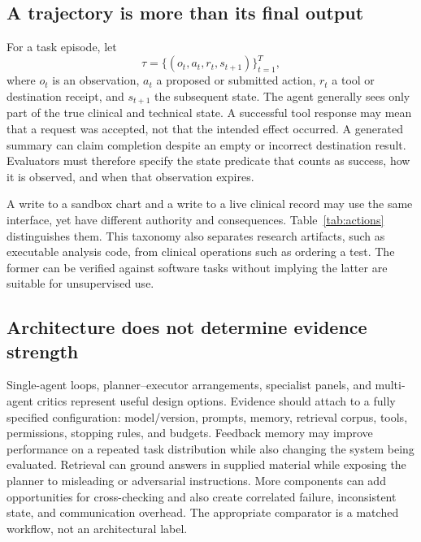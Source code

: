 \subsection{A trajectory is more than its final output}
For a task episode, let
\begin{equation}
\tau=\{(o_t,a_t,r_t,s_{t+1})\}_{t=1}^{T},
\end{equation}
where $o_t$ is an observation, $a_t$ a proposed or submitted action, $r_t$ a tool or destination receipt, and $s_{t+1}$ the subsequent state. The agent generally sees only part of the true clinical and technical state. A successful tool response may mean that a request was accepted, not that the intended effect occurred. A generated summary can claim completion despite an empty or incorrect destination result. Evaluators must therefore specify the state predicate that counts as success, how it is observed, and when that observation expires.

A write to a sandbox chart and a write to a live clinical record may use the same interface, yet have different authority and consequences. Table~\ref{tab:actions} distinguishes them. This taxonomy also separates research artifacts, such as executable analysis code, from clinical operations such as ordering a test. The former can be verified against software tasks without implying the latter are suitable for unsupervised use.

\subsection{Architecture does not determine evidence strength}
Single-agent loops, planner--executor arrangements, specialist panels, and multi-agent critics represent useful design options. Evidence should attach to a fully specified configuration: model/version, prompts, memory, retrieval corpus, tools, permissions, stopping rules, and budgets. Feedback memory may improve performance on a repeated task distribution while also changing the system being evaluated. Retrieval can ground answers in supplied material while exposing the planner to misleading or adversarial instructions. More components can add opportunities for cross-checking and also create correlated failure, inconsistent state, and communication overhead. The appropriate comparator is a matched workflow, not an architectural label.
